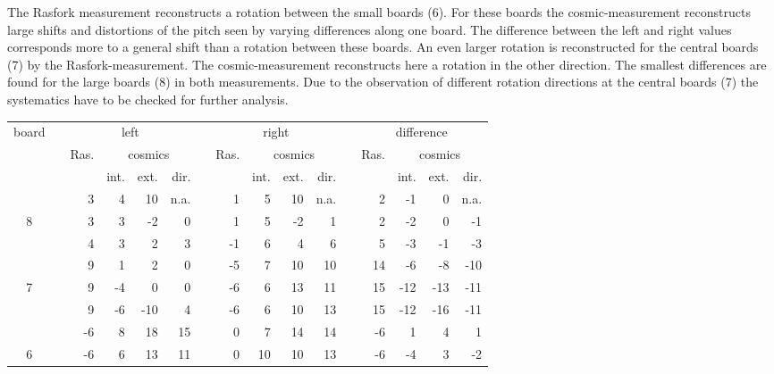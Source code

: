 \documentclass[
twoside,            %
BCOR1.4cm,          %
10pt,               %
headings=normal,    %
headsepline,        %
clearplainpage,		%
final,              %
div=14,
open=right,
bibliography=toc
]{scrreprt}
\begin{document}
The Rasfork measurement reconstructs a rotation between the small boards (6).
For these boards the cosmic-measurement reconstructs large shifts and distortions of the pitch seen by varying differences along one board.
The difference between the left and right values corresponds more to a general shift than a rotation between these boards.
An even larger rotation is reconstructed for the central boards (7) by the Rasfork-measurement.
The cosmic-measurement reconstructs here a rotation in the other direction.
The smallest differences are found for the large boards (8) in both measurements.
Due to the observation of different rotation directions at the central boards (7) the systematics have to be checked for further analysis.

\begin{table}[!h]
	\centering	
	\begin{tabular}{ccrrrrcrrrrcrrrr}
		\hline
		\hline
		board & \hspace{1mm} & \multicolumn{4}{c}{left} & \hspace{1mm} & \multicolumn{4}{c}{right} & \hspace{1mm} & \multicolumn{4}{c}{difference}
		\\
		 & & Ras. & \multicolumn{3}{c}{cosmics} & & Ras. & \multicolumn{3}{c}{cosmics} & & Ras. & \multicolumn{3}{c}{cosmics}
		\\
	 	 & &       & int. & ext. & dir. & &      & int. & ext. & dir. & &      & int. & ext. & dir.
 		\\
		\hline
		  & &    3 &    4 &   10 & n.a. & &    1 &    5 &   10 & n.a. & &    2 &   -1 &    0 & n.a.
		\\
		8 & &    3 &    3 &   -2 &    0 & &    1 &    5 &   -2 &    1 & &    2 &   -2 &    0 &   -1
		\\
		  & &    4 &    3 &    2 &    3 & &   -1 &    6 &    4 &    6 & &    5 &   -3 &   -1 &   -3
		\\
		\hline
		  & &    9 &    1 &    2 &    0 & &   -5 &    7 &   10 &   10 & &   14 &   -6 &   -8 &  -10
		\\
		7 & &    9 &   -4 &    0 &    0 & &   -6 &    6 &   13 &   11 & &   15 &  -12 &  -13 &  -11
		\\
		  & &    9 &   -6 &  -10 &    4 & &   -6 &    6 &   10 &   13 & &   15 &  -12 &  -16 &  -11
		\\
		\hline
		  & &   -6 &    8 &   18 &   15 & &    0 &    7 &   14 &   14 & &   -6 &    1 &    4 &    1
		\\
		6 & &   -6 &    6 &   13 &   11 & &    0 &   10 &   10 &   13 & &   -6 &   -4 &    3 &   -2

\end{tabular}
\end{table}
\end{document}

